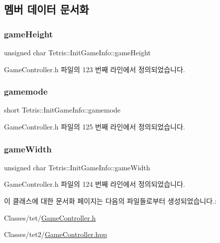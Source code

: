 \subsection{멤버 데이터 문서화}
\mbox{\label{class_tetris_1_1_init_game_info_a4b0520a703e20bf84077c2d9706a0ef2}} 
\subsubsection{\texorpdfstring{game\+Height}{gameHeight}}
{\footnotesize\ttfamily unsigned char Tetris\+::\+Init\+Game\+Info\+::game\+Height}



Game\+Controller.\+h 파일의 123 번째 라인에서 정의되었습니다.

\mbox{\label{class_tetris_1_1_init_game_info_a5d4655981462fd53da508dfba0d2e99c}} 
\subsubsection{\texorpdfstring{gamemode}{gamemode}}
{\footnotesize\ttfamily short Tetris\+::\+Init\+Game\+Info\+::gamemode}



Game\+Controller.\+h 파일의 125 번째 라인에서 정의되었습니다.

\mbox{\label{class_tetris_1_1_init_game_info_a035e9d0d8d8b92436b2683627ca51059}} 
\subsubsection{\texorpdfstring{game\+Width}{gameWidth}}
{\footnotesize\ttfamily unsigned char Tetris\+::\+Init\+Game\+Info\+::game\+Width}



Game\+Controller.\+h 파일의 124 번째 라인에서 정의되었습니다.



이 클래스에 대한 문서화 페이지는 다음의 파일들로부터 생성되었습니다.\+:\begin{DoxyCompactItemize}
\item 
Classes/tet/\hyperlink{_game_controller_8h}{Game\+Controller.\+h}\item 
Classes/tet2/\hyperlink{_game_controller_8hpp}{Game\+Controller.\+hpp}\end{DoxyCompactItemize}
